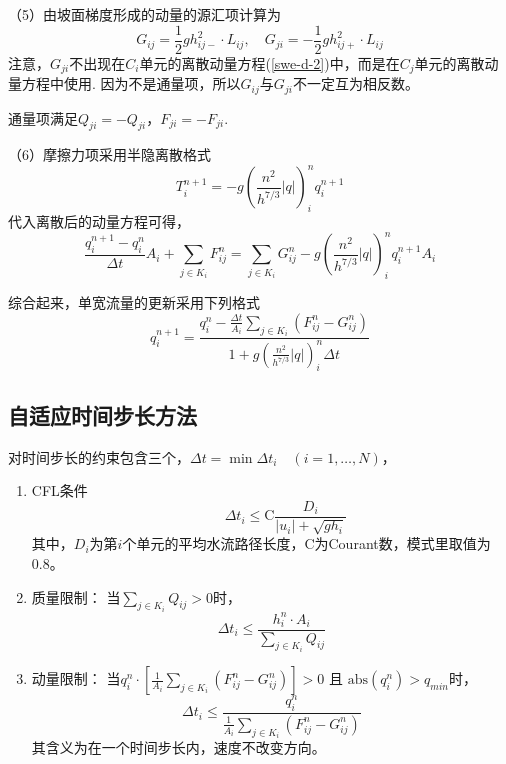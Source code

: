 （5）由坡面梯度形成的动量的源汇项计算为~\citep{audusse2004scientificcomputing}
\begin{equation}
  G_{ij} = \frac{1}{2}gh_{ij-}^2 \cdot L_{ij}, \quad
  G_{ji}=-\frac{1}{2}g h_{ij+}^2 \cdot L_{ij}
\end{equation}
注意，$G_{ji}$不出现在$C_i$单元的离散动量方程(\ref{swe-d-2})中，而是在$C_j$单元的离散动量方程中使用. 因为不是通量项，所以$G_{ij}$与$G_{ji}$不一定互为相反数。

通量项满足$Q_{ji} = -Q_{ji}$，$F_{ji}=-F_{ji}$.

（6）摩擦力项采用半隐离散格式
\begin{equation}
  T^{n+1}_i = -g \left(\frac{n^2}{h^{7/3}} \left|q\right|\right)^n_i q^{n+1}_i
\end{equation}
代入离散后的动量方程可得，
\begin{equation}
  \frac{ q^{n+1}_i - q^n_i}{\Delta t} A_i + \sum_{j\in K_i} F^n_{ij} = \sum_{j\in K_i} G^n_{ij}  -g \left(\frac{n^2}{h^{7/3}} \left|q\right|\right)^n_i q^{n+1}_i  A_i
\end{equation}

综合起来，单宽流量的更新采用下列格式
\begin{equation}
  q^{n+1}_i = \frac{q^n_i - \frac{\Delta t}{A_i}\sum_{j\in K_i} \left(F^n_{ij} - G^n_{ij}\right)}{1 + g \left(\frac{n^2}{h^{7/3}} \left|q\right|\right)^n_i \Delta t}
\end{equation}

\subsection{自适应时间步长方法}
对时间步长的约束包含三个，$\Delta t = \min \Delta t_i \quad (i=1, \ldots, N)$，
\begin{enumerate}
  \item CFL条件
    \begin{equation}
      \qquad \Delta t_i \leqslant \mathrm{C}\frac{ D_i }{\left| u_{i}\right| + \sqrt{gh_{i}}}
    \end{equation}
    其中，$D_i$为第$i$个单元的平均水流路径长度，C为Courant数，模式里取值为0.8。
  \item 质量限制：
    当$\sum_{j\in K_i} Q_{ij}>0$时，
    \begin{equation}
      \Delta t_i \leqslant \frac{h^n_i\cdot A_i}{\sum_{j\in K_i} Q_{ij}}
    \end{equation}
  \item 动量限制：
    当$q^n_i \cdot \left[ \frac{1}{A_i}\sum_{j\in K_i} \left(F^n_{ij} - G^n_{ij} \right)\right] > 0$ 且 $\mathrm{abs}\left(q^n_i\right) > q_{min}$时，
    \begin{equation}
      \Delta t_i \leqslant \frac{q^n_i}{\frac{1}{A_i}\sum_{j\in K_i} \left(F^n_{ij} - G^n_{ij} \right)}
    \end{equation}
    其含义为在一个时间步长内，速度不改变方向。
\end{enumerate}

